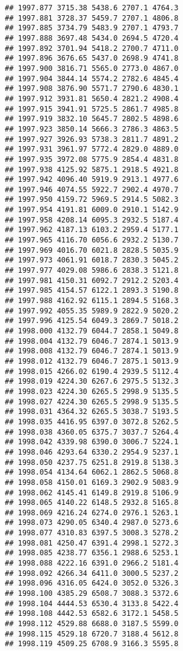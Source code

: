 \documentclass[
]{article}
\begin{document}
\begin{verbatim}
## 1997.877 3715.38 5438.6 2707.1 4764.3
## 1997.881 3728.37 5459.7 2707.1 4806.8
## 1997.885 3734.79 5483.9 2707.1 4793.7
## 1997.888 3697.48 5434.0 2694.5 4720.4
## 1997.892 3701.94 5418.2 2700.7 4711.0
## 1997.896 3676.65 5437.0 2698.9 4741.8
## 1997.900 3816.71 5565.0 2773.0 4867.0
## 1997.904 3844.14 5574.2 2782.6 4845.4
## 1997.908 3876.90 5571.7 2790.6 4830.1
## 1997.912 3931.81 5650.4 2821.2 4908.4
## 1997.915 3941.91 5725.5 2861.7 4985.8
## 1997.919 3832.10 5645.7 2802.5 4898.6
## 1997.923 3850.14 5666.3 2786.3 4863.5
## 1997.927 3926.93 5738.3 2811.7 4891.2
## 1997.931 3961.97 5772.4 2829.0 4889.0
## 1997.935 3972.08 5775.9 2854.4 4831.8
## 1997.938 4125.92 5875.1 2918.5 4921.8
## 1997.942 4096.40 5919.9 2913.1 4977.6
## 1997.946 4074.55 5922.7 2902.4 4970.7
## 1997.950 4159.72 5969.5 2914.5 5082.3
## 1997.954 4191.81 6009.0 2910.1 5142.9
## 1997.958 4208.14 6095.3 2932.5 5187.4
## 1997.962 4187.13 6103.2 2959.4 5177.1
## 1997.965 4116.70 6056.6 2932.2 5130.7
## 1997.969 4016.70 6021.8 2828.5 5035.9
## 1997.973 4061.91 6018.7 2830.3 5045.2
## 1997.977 4029.08 5986.6 2838.3 5121.8
## 1997.981 4150.31 6092.7 2912.2 5203.4
## 1997.985 4154.57 6122.1 2893.3 5190.8
## 1997.988 4162.92 6115.1 2894.5 5168.3
## 1997.992 4055.35 5989.9 2822.9 5020.2
## 1997.996 4125.54 6049.3 2869.7 5018.2
## 1998.000 4132.79 6044.7 2858.1 5049.8
## 1998.004 4132.79 6046.7 2874.1 5013.9
## 1998.008 4132.79 6046.7 2874.1 5013.9
## 1998.012 4132.79 6046.7 2875.1 5013.9
## 1998.015 4266.02 6190.4 2939.5 5112.4
## 1998.019 4224.30 6267.6 2975.5 5132.3
## 1998.023 4224.30 6265.5 2998.9 5135.5
## 1998.027 4224.30 6265.5 2998.9 5135.5
## 1998.031 4364.32 6265.5 3038.7 5193.5
## 1998.035 4416.95 6397.0 3072.8 5262.5
## 1998.038 4360.05 6375.7 3037.7 5264.4
## 1998.042 4339.98 6390.0 3006.7 5224.1
## 1998.046 4293.64 6330.2 2954.9 5237.1
## 1998.050 4237.75 6251.8 2919.8 5138.3
## 1998.054 4134.64 6062.1 2862.5 5068.8
## 1998.058 4150.01 6169.3 2902.9 5083.9
## 1998.062 4145.41 6149.8 2919.8 5106.9
## 1998.065 4140.22 6148.5 2932.8 5165.8
## 1998.069 4216.24 6274.0 2976.1 5263.1
## 1998.073 4290.05 6340.4 2987.0 5273.6
## 1998.077 4310.83 6397.5 3008.3 5278.2
## 1998.081 4250.47 6391.4 2998.1 5272.3
## 1998.085 4238.77 6356.1 2988.6 5253.1
## 1998.088 4222.16 6391.0 2966.2 5181.4
## 1998.092 4266.34 6411.0 3000.5 5237.2
## 1998.096 4316.05 6424.0 3052.0 5326.3
## 1998.100 4385.29 6508.7 3088.3 5372.6
## 1998.104 4444.53 6530.4 3133.8 5422.4
## 1998.108 4442.53 6582.6 3172.1 5458.5
## 1998.112 4529.88 6688.0 3187.5 5599.0
## 1998.115 4529.18 6720.7 3188.4 5612.8
## 1998.119 4509.25 6708.9 3166.3 5595.8

\end{verbatim}
\end{document}
